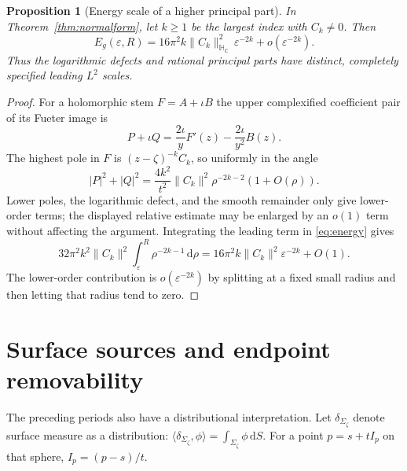 \documentclass[11pt,a4paper]{article}
\numberwithin{equation}{section}
\newtheorem{proposition}[theorem]{Proposition}
\theoremstyle{definition}
\theoremstyle{remark}
\newcommand{\C}{\mathbb C}
\newcommand{\HC}{\mathbb H_{\C}}
\newcommand{\dd}{\,\mathrm d}
\begin{document}
\begin{proposition}[Energy scale of a higher principal part]
\label{prop:poleenergy}
In Theorem~\ref{thm:normalform}, let $k\geq1$ be the largest index with
$C_k\ne0$. Then
\begin{equation}
 E_g(\varepsilon,R)
 =16\pi^2 k\|C_k\|_{\HC}^2\,\varepsilon^{-2k}
       +o(\varepsilon^{-2k}).
 \label{eq:poleenergy}
\end{equation}
Thus the logarithmic defects and rational principal parts have distinct,
completely specified leading $L^2$ scales.
\end{proposition}
\begin{proof}
For a holomorphic stem $F=A+\iota B$ the upper complexified coefficient
pair of its Fueter image is
\[
 P+\iota Q=\frac{2\iota}{y}F'(z)-\frac{2\iota}{y^2}B(z).
\]
The highest pole in $F$ is $(z-\zeta)^{-k}C_k$, so uniformly in the
angle
\[
 |P|^2+|Q|^2
 =\frac{4k^2}{t^2}\|C_k\|^2\rho^{-2k-2}(1+O(\rho)).
\]
Lower poles, the logarithmic defect, and the smooth remainder only give
lower-order terms; the displayed relative estimate may be enlarged by
an $o(1)$ term without affecting the argument. Integrating the leading
term in \eqref{eq:energy} gives
\[
 32\pi^2k^2\|C_k\|^2\int_\varepsilon^R\rho^{-2k-1}\dd\rho
 =16\pi^2k\|C_k\|^2\varepsilon^{-2k}+O(1).
\]
The lower-order contribution is $o(\varepsilon^{-2k})$ by splitting at
a fixed small radius and then letting that radius tend to zero.
\end{proof}

\section{Surface sources and endpoint removability}
\label{sec:source}
The preceding periods also have a distributional interpretation. Let
$\delta_{\Sigma_\zeta}$ denote surface measure as a distribution:
$\langle\delta_{\Sigma_\zeta},\phi\rangle
=\int_{\Sigma_\zeta}\phi\dd S$. For a point
$p=s+tI_p$ on that sphere, $I_p=(p-s)/t$.
\end{document}
